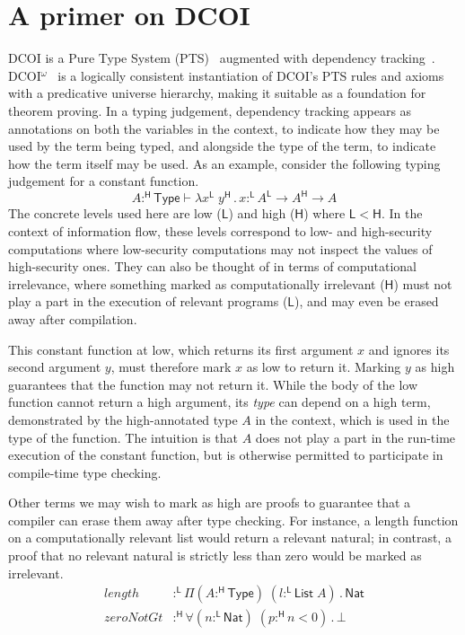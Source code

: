 \documentclass{article}
\newcommand{\kw}[1]{\mathsf{#1}}
\newcommand{\HH}{\mathsf{H}}
\newcommand{\LL}{\mathsf{L}}
\begin{document}
\section{A primer on DCOI} \label{sec:dcoi}

DCOI is a Pure Type System (PTS)~\citep{pts} augmented with dependency tracking~\cite{dcc}.
DCOI$^\omega$~\citep{dcoi-omega} is a logically consistent instantiation
of DCOI's PTS rules and axioms with a predicative universe hierarchy,
making it suitable as a foundation for theorem proving.
In a typing judgement, dependency tracking appears as annotations
on both the variables in the context,
to indicate how they may be used by the term being typed,
and alongside the type of the term,
to indicate how the term itself may be used.
As an example, consider the following typing judgement for a constant function.
$$A :^\HH \kw{Type} \vdash \lambda x^\LL \; y^\HH \mathpunct{.} x :^\LL
  A^\LL \to A^\HH \to A$$
The concrete levels used here are low ($\LL$) and high ($\HH$) where $\LL < \HH$.
In the context of information flow,
these levels correspond to low- and high-security computations
where low-security computations may not inspect the values of high-security ones.
They can also be thought of in terms of computational irrelevance,
where something marked as computationally irrelevant ($\HH$)
must not play a part in the execution of relevant programs ($\LL$),
and may even be erased away after compilation.

This constant function at low,
which returns its first argument $x$ and ignores its second argument $y$,
must therefore mark $x$ as low to return it.
Marking $y$ as high guarantees that the function may not return it.
While the body of the low function cannot return a high argument,
its \emph{type} can depend on a high term,
demonstrated by the high-annotated type $A$ in the context,
which is used in the type of the function.
The intuition is that $A$ does not play a part in the run-time execution of the constant function,
but is otherwise permitted to participate in compile-time type checking.

Other terms we may wish to mark as high are proofs
to guarantee that a compiler can erase them away after type checking.
For instance, a length function on a computationally relevant list would return a relevant natural;
in contrast, a proof that no relevant natural is strictly less than zero would be marked as irrelevant.
%
\begin{align*}
  \mathit{length} &:^\LL \Pi (A :^\HH \kw{Type}) \; (l :^\LL \kw{List} \; A) \mathpunct{.} \kw{Nat} \\
  \mathit{zeroNotGt} &:^\HH \forall (n :^\LL \kw{Nat}) \; (p :^\HH n < 0) \mathpunct{.} \bot
\end{align*}
\end{document}
